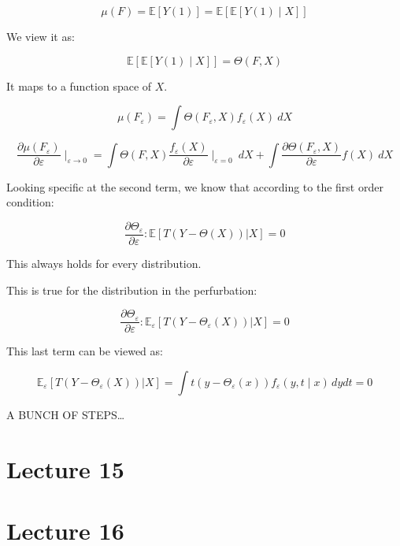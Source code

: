\documentclass{article}
\begin{document}
$$
\mu(F) = \mathbb{E}[Y(1)] = \mathbb{E}[\mathbb{E}[Y(1) \mid X]]
$$

We view it as:

$$
\mathbb{E}[\mathbb{E}[Y(1) \mid X]] = \Theta(F, X)
$$

It maps to a function space of $X$.

$$
\mu(F_{\varepsilon}) = \int \Theta(F_{\varepsilon}, X) f_{\varepsilon}(X) \ dX
$$

$$
\frac{\partial \mu (F_{\varepsilon})}{\partial \varepsilon} \mid_{\varepsilon \to 0}
=
\int \Theta(F, X) \frac{f_{\varepsilon}(X)}{\partial \varepsilon} \mid_{\varepsilon = 0} \ dX
+ 
\int \frac{\partial \Theta(F_{\varepsilon}, X)}{\partial \varepsilon} f(X) \ dX
$$

Looking specific at the second term, we know that according to the first order condition:

$$
\frac{\partial \Theta_{\varepsilon}}{\partial \varepsilon}:
\mathbb{E}[T(Y - \Theta(X)) | X] = 0
$$

This always holds for every distribution.

This is true for the distribution in the perfurbation:

$$
\frac{\partial \Theta_{\varepsilon}}{\partial \varepsilon}:
\mathbb{E}_{\varepsilon}[T(Y - \Theta_{\varepsilon}(X)) | X] = 0
$$

This last term can be viewed as:

$$
\mathbb{E}_{\varepsilon}[T(Y - \Theta_{\varepsilon}(X)) | X] =
\int t (y - \Theta_{\varepsilon}(x)) f_{\varepsilon} (y, t \mid x) \, dy dt = 0
$$

A BUNCH OF STEPS\dots

\section{Lecture 15}

\section{Lecture 16}
\end{document}
